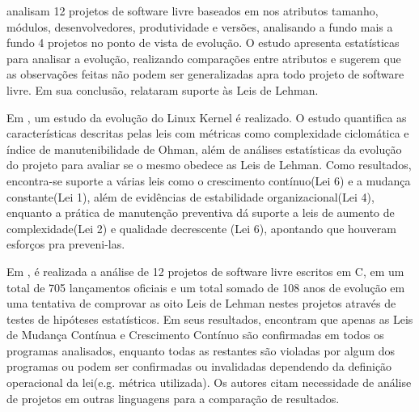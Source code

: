 \cite{carver2004impact} analisam 12 projetos de software livre baseados em nos atributos tamanho, módulos, desenvolvedores, produtividade e versões, analisando a fundo mais a fundo 4 projetos no ponto de vista de evolução. O estudo apresenta estatísticas para analisar a evolução, realizando comparações entre atributos e sugerem que as observações feitas não podem ser generalizadas apra todo projeto de software livre. Em sua conclusão, relataram suporte às Leis de Lehman.

Em \cite{israeli2010linux}, um estudo da evolução do Linux Kernel é realizado. O estudo quantifica as características descritas pelas leis com métricas como complexidade ciclomática e índice de manutenibilidade de Ohman, além de análises estatísticas da evolução do projeto para avaliar se o mesmo obedece as Leis de Lehman. Como resultados, encontra-se suporte a várias leis como o crescimento contínuo(Lei 6) e a mudança constante(Lei 1), além de evidências de estabilidade organizacional(Lei 4), enquanto a prática de manutenção preventiva dá suporte a leis de aumento de complexidade(Lei 2) e qualidade decrescente (Lei 6), apontando que houveram esforços pra preveni-las. 

Em \cite{neamtiu2013towards}, é realizada a análise de 12 projetos de software livre escritos em C, em um total de 705 lançamentos oficiais e um total somado de 108 anos de evolução em uma tentativa de comprovar as oito Leis de Lehman nestes projetos através de testes de hipóteses estatísticos. Em seus resultados, encontram que apenas as Leis de Mudança Contínua e Crescimento Contínuo são confirmadas em todos os programas analisados, enquanto todas as restantes são violadas por algum dos programas ou podem ser confirmadas ou invalidadas dependendo da definição operacional da lei(e.g. métrica utilizada). Os autores citam necessidade de análise de projetos em outras linguagens para a comparação de resultados.